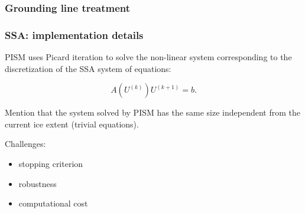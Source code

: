 \documentclass[hide notes,intlimits]{beamer}
\begin{document}
\begin{frame}
  \frametitle{Grounding line treatment}



\end{frame}

\begin{frame}
  \frametitle{SSA: implementation details}

  PISM uses Picard iteration to solve the non-linear system
  corresponding to the discretization of the SSA system of equations:

  \begin{equation}
    \label{eq:4}
    A(U^{(k)}) U^{(k+1)} = b.
  \end{equation}

  Mention that the system solved by PISM has the same size independent
  from the current ice extent (trivial equations).

  Challenges:
  \begin{itemize}
  \item stopping criterion
  \item robustness
  \item computational cost
  \end{itemize}
\end{frame}
\end{document}
